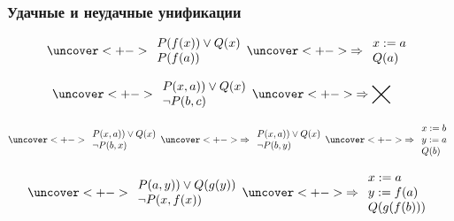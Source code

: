 \documentclass[24pt,pdf,hyperref={unicode}]{beamer}
\newcommand{\nothing}
{
\begin{minipage}{1cm}
\begin{tikzpicture}[x=0.5cm,y=0.5cm]
\draw[thick] (0,0)--(1,1);
\draw[thick] (0,1)--(1,0);
\end{tikzpicture}
\end{minipage}
}
\begin{document}
\begin{frame}\frametitle{Удачные и неудачные унификации}

$$
\uncover<+->{
\begin{array}{l}
P(f(x))\vee Q(x) \\
P(f(a))
\end{array}
}
\uncover<+->{
\Rightarrow
\begin{array}{l}
x:=a\\
Q(a)
\end{array}
}
$$

$$
\uncover<+->{
\begin{array}{l}
P(x,a))\vee Q(x) \\
\neg P(b,c)
\end{array}
}
\uncover<+->{
\Rightarrow
\nothing
}
$$

$$
\uncover<+->{
\begin{array}{l}
P(x,a))\vee Q(x) \\
\neg P(b,x)
\end{array}
}
\uncover<+->{
\Rightarrow
\begin{array}{l}
P(x,a))\vee Q(x) \\
\neg P(b,y)
\end{array}
}
\uncover<+->{
\Rightarrow
\begin{array}{l}
x:=b\\
y:=a\\
Q(b)\\
\end{array}
}
$$

$$
\uncover<+->{
\begin{array}{l}
P(a,y))\vee Q(g(y)) \\
\neg P(x,f(x))
\end{array}
}
\uncover<+->{
\Rightarrow
\begin{array}{l}
x:=a\\
y:=f(a)\\
Q(g(f(b)))\\
\end{array}
}
$$
\end{frame}
\end{document}
